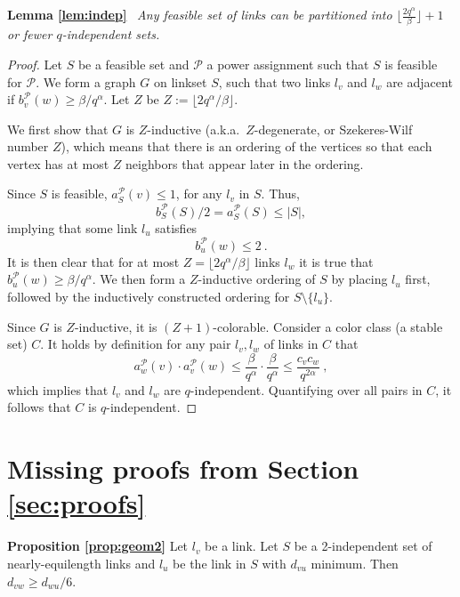 \documentclass[11pt]{amsart}
\newcommand{\cal}[1]{\mathcal{#1}}
\def\calP{{\cal P}}
\def\calP{{\cal P}}   \def\calM{{\cal M}}   \def\calU{{\cal U}}   \newcommand{\PCopt}{\overline{OPT}}
\begin{document}
\noindent \textbf{Lemma \ref{lem:indep}}\ 
\emph{
Any feasible set of links can be partitioned into 
$\lfloor \frac{2q^\alpha}{\beta}\rfloor +1$ or fewer $q$-independent sets.
}
\begin{proof}
Let $S$ be a feasible set and 
$\calP$ a power assignment such that $S$ is feasible for $\calP$.  We form
a graph $G$ on linkset $S$, such that two links $l_v$ and $l_w$ are
adjacent if $b^\calP_v(w) \ge \beta/q^\alpha$.
Let $Z$ be $Z := \lfloor 2q^\alpha/\beta \rfloor$.



We first show that $G$ is $Z$-inductive (a.k.a.\ $Z$-degenerate,
or Szekeres-Wilf number $Z$), which means that there is an ordering of the
vertices so that each vertex has at most $Z$ neighbors that appear
later in the ordering.

Since $S$ is feasible, $a_S^\calP(v) \le 1$, for any $l_v$ in $S$.
Thus, 
\[b^\calP_S(S)/2 = a_S^\calP(S) \le |S|,\]
 implying that some link $l_u$ satisfies
\[ b^\calP_u(w) \le 2 \ . \]
It is then clear that for at most $Z = \lfloor 2q^\alpha/\beta \rfloor$ links 
$l_w$ it is true that $b^\calP_u(w) \ge \beta/q^\alpha$.
We then form a $Z$-inductive ordering of $S$
by placing $l_u$ first, followed by the inductively constructed ordering for $S
\setminus \{l_u\}$. 

Since $G$ is $Z$-inductive, it is $(Z+1)$-colorable.
Consider a color class (a stable set) $C$.
It holds by definition for any pair $l_v, l_w$ of links in $C$
that
\[ a_w^\calP(v) \cdot a_v^\calP(w) 
   \le \frac{\beta}{q^{\alpha}} \cdot \frac{\beta}{q^{\alpha}} 
   \le \frac{c_v c_w }{q^{2 \alpha}}\ , \]
which implies that $l_v$ and $l_w$ are $q$-independent.
Quantifying over all pairs in $C$, it follows that $C$ is
$q$-independent. 
\end{proof}


\section{Missing proofs from Section \ref{sec:proofs}}
\label{app:proof-effective}







\noindent \textbf{Proposition \ref{prop:geom2}}  Let $l_v$ be a link.  Let $S$ be a 2-independent set of
nearly-equilength links and $l_u$ be the link in $S$ with $d_{vu}$
minimum. Then $d_{vw}\geq d_{wu}/6$.
\\
\end{document}

